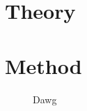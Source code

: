 \mainmatter

\chapter{Theory}
\label{cha:theory}


\vfill{}

\chapter{Method}
\label{cha:method}


\begin{figure}[htpb]
    \centering
    \resizebox{0.8\linewidth}{!}{}
    \caption{Dawg}
    \label{fig:Dawg}
\end{figure}



